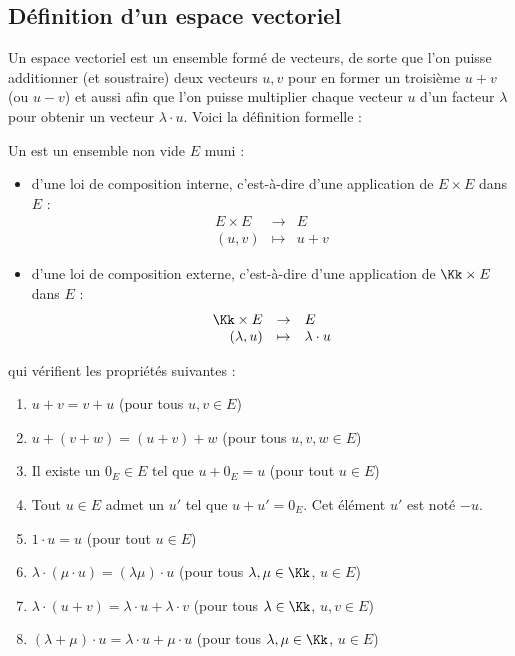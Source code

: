\documentclass[class=report,crop=false]{standalone}
\begin{document}
\subsection{Définition d'un espace vectoriel}


Un espace vectoriel est un ensemble formé de vecteurs, de sorte que l'on puisse
additionner (et soustraire) deux vecteurs $u,v$ pour en former un troisième $u+v$ (ou $u-v$)
et aussi afin que l'on puisse multiplier chaque vecteur $u$ d'un facteur $\lambda$ pour obtenir
un vecteur $\lambda \cdot u$.
Voici la définition formelle :
\begin{definition}
Un  est un ensemble non vide $E$ muni :
\begin{itemize}
  \item d'une loi de composition interne, c'est-à-dire
  d'une application de $E \times E$ dans $E$ :
$$\begin{array}{rcl}
E \times E & \to & E\\
(u, v) & \mapsto & u+v
\end{array}$$

  \item d'une loi de composition externe,
  c'est-à-dire d'une application de $\Kk \times E$ dans $E$ :
$$\begin{array}{rcl}
\Kk \times E & \to & E\\
(\lambda, u ) & \mapsto & \lambda \cdot u
\end{array}$$
\end{itemize}

qui vérifient les propriétés suivantes :
 \begin{enumerate}
 \item $u + v = v + u$ \quad (pour tous $u,v \in E$)
 \item $u + (v+w) = (u+v) +w$ \quad (pour tous $u,v,w \in E$)
 \item Il existe un  $0_E \in E$ tel que $u + 0_E = u$ \quad (pour tout $u \in E$)
 \item Tout $u \in E$ admet un  $u'$ tel que $u + u' = 0_E$.
 Cet élément $u'$ est noté $-u$.
 \item $1 \cdot u = u$ \quad (pour tout $u \in E$)
 \item $\lambda \cdot (\mu \cdot u) = (\lambda\mu )\cdot u$ \quad (pour tous $\lambda, \mu \in \Kk$, $u \in E$)
 \item $\lambda \cdot (u+v) = \lambda \cdot u + \lambda \cdot v$ \quad (pour tous $\lambda \in \Kk$, $u,v \in E$)
 \item $(\lambda + \mu ) \cdot u = \lambda \cdot u + \mu \cdot u$ \quad (pour tous $\lambda,\mu \in \Kk$, $u \in E$)
 \end{enumerate}
 \end{definition}
\end{document}
